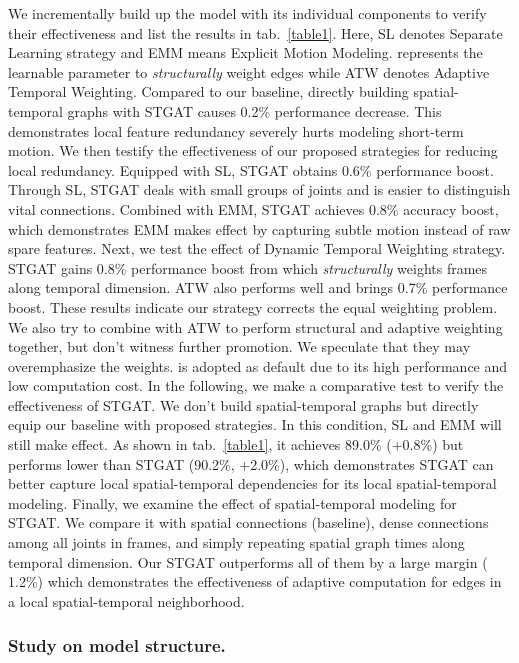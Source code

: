 \documentclass[runningheads]{llncs}
\begin{document}
We incrementally build up the model with its individual components to verify their effectiveness and list the results in tab.~\ref{table1}. Here, SL denotes Separate Learning strategy and EMM means Explicit Motion Modeling.  represents the learnable parameter to \textit{structurally} weight edges while ATW denotes Adaptive Temporal Weighting. Compared to our baseline, directly building spatial-temporal graphs with STGAT causes 0.2\% performance decrease. This demonstrates local feature redundancy severely hurts modeling short-term motion. We then testify the effectiveness of our proposed strategies for reducing local redundancy. Equipped with SL, STGAT obtains 0.6\% performance boost. Through SL, STGAT deals with small groups of joints and is easier to distinguish vital connections. Combined with EMM, STGAT achieves 0.8\% accuracy boost, which demonstrates EMM makes effect by capturing subtle motion instead of raw spare features. Next, we test the effect of Dynamic Temporal Weighting strategy. STGAT gains 0.8\% performance boost from  which \textit{structurally} weights frames along temporal dimension. ATW also performs well and brings 0.7\% performance boost. These results indicate our strategy corrects the equal weighting problem. We also try to combine  with ATW to perform structural and adaptive weighting together, but don't witness further promotion. We speculate that they may overemphasize the weights.  is adopted as default due to its high performance and low computation cost. In the following, we make a comparative test to verify the effectiveness of STGAT. We don't build spatial-temporal graphs but directly equip our baseline with proposed strategies. In this condition, SL and EMM will still make effect. As shown in tab.~\ref{table1}, it achieves 89.0\% (+0.8\%) but performs lower than STGAT (90.2\%, +2.0\%), which demonstrates STGAT can better capture local spatial-temporal dependencies for its local spatial-temporal modeling. Finally, we examine the effect of spatial-temporal modeling for STGAT. We compare it with spatial connections (baseline), dense connections among all joints in  frames, and simply repeating spatial graph  times along temporal dimension. Our STGAT outperforms all of them by a large margin ( 1.2\%) which demonstrates the effectiveness of adaptive computation for edges in a local spatial-temporal neighborhood. 
\subsubsection{Study on model structure.}
\end{document}
